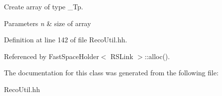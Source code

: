 Create array of type \-\_\-\-Tp. 


\begin{DoxyParams}{Parameters}
{\em n} & size of array \\
\hline
\end{DoxyParams}


Definition at line 142 of file Reco\-Util.\-hh.



Referenced by Fast\-Space\-Holder$<$ R\-S\-Link $>$\-::alloc().



The documentation for this class was generated from the following file\-:\begin{DoxyCompactItemize}
\item 
Reco\-Util.\-hh\end{DoxyCompactItemize}
